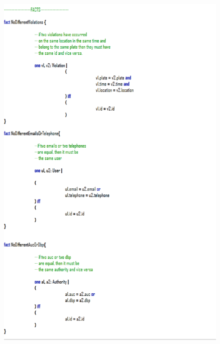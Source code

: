 \documentclass[12pt,a4paper]{article}
\begin{document}
			\begin{figure}[H]
				\centering
				\includegraphics[width=1\linewidth]{images/exports/user/Facts1.png}
				\label{fig:facts1}
			\end{figure}
\end{document}
